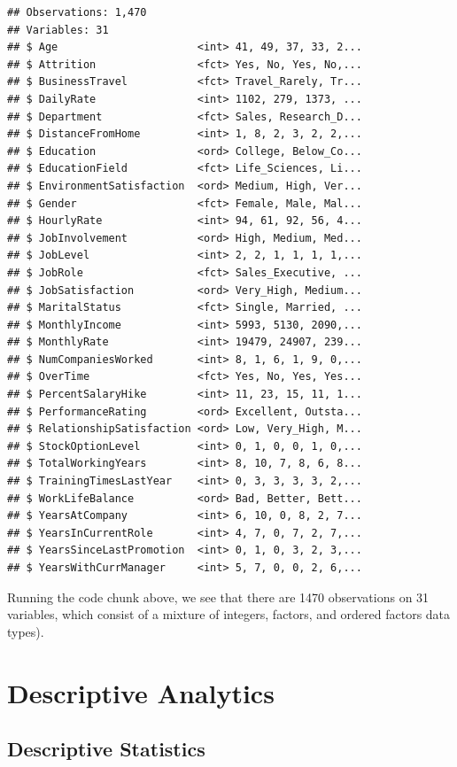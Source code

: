 \documentclass[]{book}
\theoremstyle{definition}
\theoremstyle{definition}
\theoremstyle{definition}
\theoremstyle{remark}
\begin{document}
\begin{verbatim}
## Observations: 1,470
## Variables: 31
## $ Age                      <int> 41, 49, 37, 33, 2...
## $ Attrition                <fct> Yes, No, Yes, No,...
## $ BusinessTravel           <fct> Travel_Rarely, Tr...
## $ DailyRate                <int> 1102, 279, 1373, ...
## $ Department               <fct> Sales, Research_D...
## $ DistanceFromHome         <int> 1, 8, 2, 3, 2, 2,...
## $ Education                <ord> College, Below_Co...
## $ EducationField           <fct> Life_Sciences, Li...
## $ EnvironmentSatisfaction  <ord> Medium, High, Ver...
## $ Gender                   <fct> Female, Male, Mal...
## $ HourlyRate               <int> 94, 61, 92, 56, 4...
## $ JobInvolvement           <ord> High, Medium, Med...
## $ JobLevel                 <int> 2, 2, 1, 1, 1, 1,...
## $ JobRole                  <fct> Sales_Executive, ...
## $ JobSatisfaction          <ord> Very_High, Medium...
## $ MaritalStatus            <fct> Single, Married, ...
## $ MonthlyIncome            <int> 5993, 5130, 2090,...
## $ MonthlyRate              <int> 19479, 24907, 239...
## $ NumCompaniesWorked       <int> 8, 1, 6, 1, 9, 0,...
## $ OverTime                 <fct> Yes, No, Yes, Yes...
## $ PercentSalaryHike        <int> 11, 23, 15, 11, 1...
## $ PerformanceRating        <ord> Excellent, Outsta...
## $ RelationshipSatisfaction <ord> Low, Very_High, M...
## $ StockOptionLevel         <int> 0, 1, 0, 0, 1, 0,...
## $ TotalWorkingYears        <int> 8, 10, 7, 8, 6, 8...
## $ TrainingTimesLastYear    <int> 0, 3, 3, 3, 3, 2,...
## $ WorkLifeBalance          <ord> Bad, Better, Bett...
## $ YearsAtCompany           <int> 6, 10, 0, 8, 2, 7...
## $ YearsInCurrentRole       <int> 4, 7, 0, 7, 2, 7,...
## $ YearsSinceLastPromotion  <int> 0, 1, 0, 3, 2, 3,...
## $ YearsWithCurrManager     <int> 5, 7, 0, 0, 2, 6,...
\end{verbatim}

Running the code chunk above, we see that there are 1470 observations on
31 variables, which consist of a mixture of integers, factors, and
ordered factors data types).

\hypertarget{part-descriptive-analytics}{%
\part{Descriptive
Analytics}\label{part-descriptive-analytics}}

\hypertarget{descriptive}{%
\chapter{Descriptive Statistics}\label{descriptive}}
\end{document}
